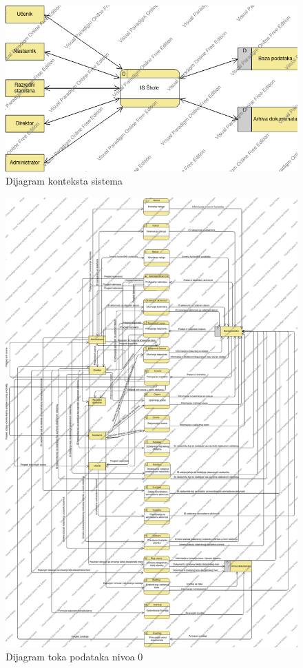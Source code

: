 \documentclass{article}
\begin{document}
\begin{figure} [!ht]
    \begin{center}
        \includegraphics[scale=0.5]{imgs/dijagram_konteksta.png}
    \end{center}
\caption{Dijagram konteksta sistema}
\end{figure}

\begin{figure} [!ht]
    \begin{center}
        \includegraphics[scale=0.2]{imgs/dijagram_nivoa_0.png}
    \end{center}
\caption{Dijagram toka podataka nivoa 0}
\end{figure}
\end{document}
